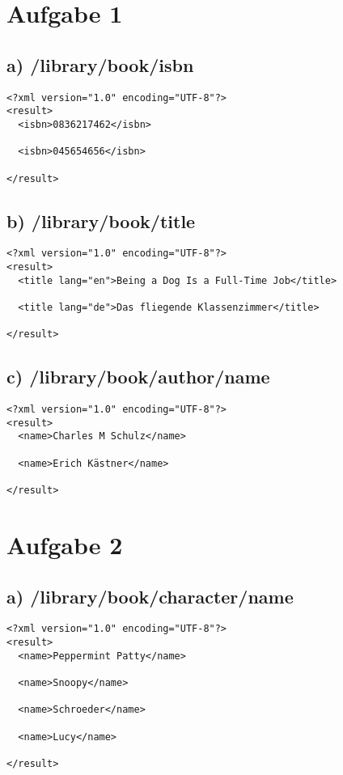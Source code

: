 \documentclass{az_article}
\author{Andreas Zweili}
\date{\today}
\title{}
\begin{document}
\tableofcontents
    \newpage
    \section{Aufgabe 1}
\label{sec:org306d8a3}
\subsection{a) /library/book/isbn}
\label{sec:org15353ce}
\begin{verbatim}
<?xml version="1.0" encoding="UTF-8"?>
<result>
  <isbn>0836217462</isbn>

  <isbn>045654656</isbn>

</result>
\end{verbatim}
\subsection{b) /library/book/title}
\label{sec:org2dca311}
\begin{verbatim}
<?xml version="1.0" encoding="UTF-8"?>
<result>
  <title lang="en">Being a Dog Is a Full-Time Job</title>

  <title lang="de">Das fliegende Klassenzimmer</title>

</result>
\end{verbatim}
\subsection{c) /library/book/author/name}
\label{sec:org6f5e358}
\begin{verbatim}
<?xml version="1.0" encoding="UTF-8"?>
<result>
  <name>Charles M Schulz</name>

  <name>Erich Kästner</name>

</result>
\end{verbatim}
\section{Aufgabe 2}
\label{sec:org4522724}
\subsection{a) /library/book/character/name}
\label{sec:org34dda39}
\begin{verbatim}
<?xml version="1.0" encoding="UTF-8"?>
<result>
  <name>Peppermint Patty</name>

  <name>Snoopy</name>

  <name>Schroeder</name>

  <name>Lucy</name>

</result>
\end{verbatim}
\end{document}
